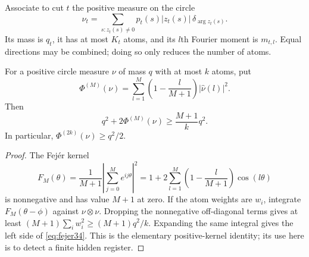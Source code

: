Associate to cut $t$ the positive measure on the circle
\begin{equation}\label{eq:circle-measure34}
 \nu_t=\sum_{s:z_t(s)\ne0}p_t(s)|z_t(s)|\,
                              \delta_{\arg z_t(s)}.
\end{equation}
Its mass is $q_t$, it has at most $K_t$ atoms, and its $l$th Fourier
moment is $m_{t,l}$. Equal directions may be combined; doing so only
reduces the number of atoms.

\begin{lemma}\label{lem:fejer34}
For a positive circle measure $\nu$ of mass $q$ with at most $k$ atoms,
put
\[
 \Phi^{(M)}(\nu)=\sum_{l=1}^M
               \left(1-\frac l{M+1}\right)|\widehat\nu(l)|^2.
\]
Then
\begin{equation}\label{eq:fejer34}
 q^2+2\Phi^{(M)}(\nu)\ge\frac{M+1}{k}q^2.
\end{equation}
In particular, $\Phi^{(2k)}(\nu)\ge q^2/2$.
\end{lemma}
\begin{proof}
The Fej\'er kernel
\[
 F_M(\theta)=\frac1{M+1}\left|\sum_{j=0}^M e^{ij\theta}\right|^2
     =1+2\sum_{l=1}^M\left(1-\frac l{M+1}\right)\cos(l\theta)
\]
is nonnegative and has value $M+1$ at zero. If the atom weights are
$w_i$, integrate $F_M(\theta-\phi)$ against $\nu\otimes\nu$.
Dropping the nonnegative off-diagonal terms gives at least
$(M+1)\sum_iw_i^2\ge(M+1)q^2/k$. Expanding the same integral gives
the left side of \eqref{eq:fejer34}. This is the elementary positive-kernel
identity; its use here is to detect a finite hidden register.
\end{proof}


